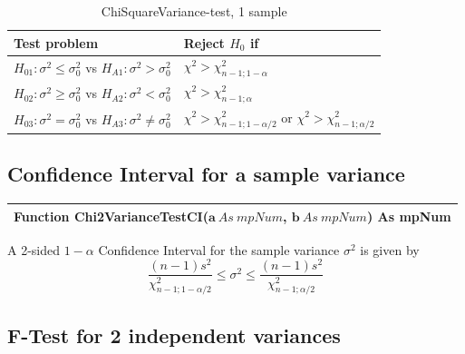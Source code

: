 \vspace{0.3cm}


\begin{table}[ht]
	\centering
	\begin{tabular}{|l|l|}
		\hline
		Test problem & Reject $H_0$ if \\
		\hline
		$H_{01}: \sigma^2 \leq \sigma^2_0$ vs $H_{A1}: \sigma^2 > \sigma^2_0$ & $\chi^2 > \chi^2_{n-1;1-\alpha}$ \\
		$H_{02}: \sigma^2 \geq \sigma^2_0$ vs $H_{A2}: \sigma^2 < \sigma^2_0$ & $\chi^2 > \chi^2_{n-1;\alpha}$ \\
		$H_{03}: \sigma^2 = \sigma^2_0$ vs $H_{A3}: \sigma^2 \neq \sigma^2_0$ & $\chi^2 > \chi^2_{n-1;1-\alpha/2}$ or $\chi^2 > \chi^2_{n-1;\alpha/2}$ \\
		\hline
	\end{tabular}
	\caption{ChiSquareVariance-test, 1 sample}
	\label{ChiSquareVariance-test, 1 sample}
\end{table}


\subsection{Confidence Interval for a sample variance}
\begin{tabular}{p{481pt}}
	\toprule
	\textsf{Function \textbf{Chi2VarianceTestCI}($\boldsymbol{a}\ As\ mpNum$, $\boldsymbol{b}\ As\ mpNum$) As mpNum}\index{Multiprecision Functions!Chi2VarianceTestCI} \\
	\bottomrule
\end{tabular}

\vspace{0.3cm}
A 2-sided $1-\alpha$ Confidence Interval for the sample variance $\sigma^2$ is given by
\begin{equation}
	\frac{(n-1)s^2}{\chi^2_{n-1;1-\alpha/2}} \leq \sigma^2 \leq \frac{(n-1)s^2}{\chi^2_{n-1;\alpha/2}}
\end{equation}


\subsection{F-Test for 2 independent variances}
\label{2iSamplesFTest}


